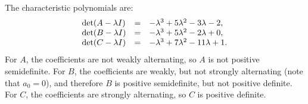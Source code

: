 \begin{solution}
  The characteristic polynomials are:
  \begin{equation*}
    \begin{array}{lcl}
      \det(A-\lambda I) &=& -\lambda^3 + 5\lambda^2 - 3\lambda - 2, \\
      \det(B-\lambda I) &=& -\lambda^3 + 5\lambda^2 - 2\lambda + 0, \\
      \det(C-\lambda I) &=& -\lambda^3 + 7\lambda^2 - 11\lambda + 1. \\
    \end{array}
  \end{equation*}
  For $A$, the coefficients are not weakly alternating, so $A$ is not
  positive semidefinite. For $B$, the coefficients are weakly, but not
  strongly alternating (note that $a_0=0$), and therefore $B$ is
  positive semidefinite, but not positive definite. For $C$, the
  coefficients are strongly alternating, so $C$ is positive definite.
\end{solution}
